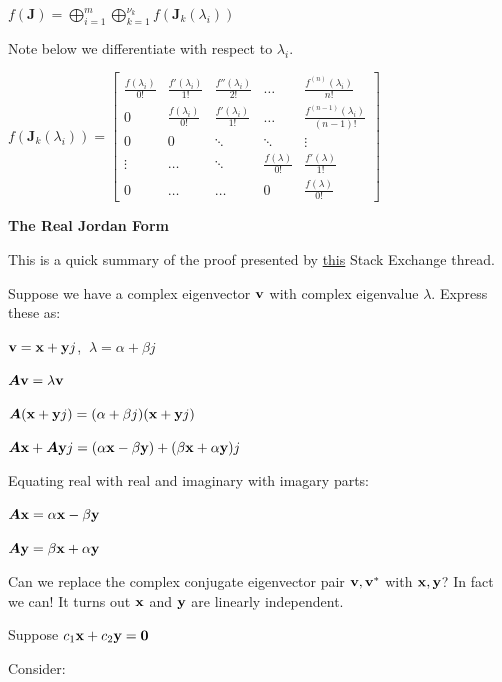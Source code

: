 \documentclass[11pt]{article}
\begin{document}
  \(f(\bm{J}) = \displaystyle \bigoplus_{i = 1}^{m} \bigoplus_{k = 1}^{\nu_k}f(\bm{J}_k(\lambda_i))\)

  Note below we differentiate with respect to \(\lambda_i\).

  \(f(\bm{J}_k(\lambda_i)) =
  \begin{bmatrix}
    \frac{f(\lambda_i)}{0!} & \frac{f'(\lambda_i)}{1!} & \frac{f''(\lambda_i)}{2!} & \dots & \frac{f^{(n)}(\lambda_i)}{n!} \\
    0 & \frac{f(\lambda_i)}{0!} & \frac{f'(\lambda_i)}{1!} & \dots & \frac{f^{(n - 1)}(\lambda_i)}{(n - 1)!} \\
    0 & 0 & \ddots & \ddots & \vdots \\
    \vdots & \dots & \ddots & \frac{f(\lambda)}{0!} & \frac{f'(\lambda)}{1!} \\
    0 & \dots & \dots & 0 & \frac{f(\lambda)}{0!}
  \end{bmatrix}\)

  \textbf{The Real Jordan Form}

  This is a quick summary of the proof presented by
  \href{https://math.stackexchange.com/questions/769312/proof-for-real-jordan-canonical-form}{this} Stack Exchange thread.

  Suppose we have a complex eigenvector \(\mathbf{v}\) with complex eigenvalue \(\lambda\). Express these as:

  \(\mathbf{v} = \mathbf{x} + \mathbf{y}j\),
  \(\ \lambda = \alpha + \beta j\)

  \(\bm{A}\mathbf{v} = \lambda\mathbf{v}\)

  \(\bm{A}{\left( \mathbf{x} + \mathbf{y}j \right)} = (\alpha + \beta j){\left( \mathbf{x} + \mathbf{y}j \right)}\)

  \(\bm{A}\mathbf{x} + \bm{A}\mathbf{y}j = (\alpha\mathbf{x} - \beta\mathbf{y}) + (\beta\mathbf{x} + \alpha\mathbf{y})j\)

  Equating real with real and imaginary with imagary parts:

  \(\bm{A}\mathbf{x} = \alpha\mathbf{x} - \beta\mathbf{y}\)

  \(\bm{A}\mathbf{y} = \beta\mathbf{x} + \alpha\mathbf{y}\)

  Can we replace the complex conjugate eigenvector pair \(\mathbf{v}, \mathbf{v}^*\) with \(\mathbf{x}, \mathbf{y}\)?
  In fact we can! It turns out \(\mathbf{x}\) and \(\mathbf{y}\) are linearly independent.

  \pagebreak

  Suppose \(c_1\mathbf{x} + c_2\mathbf{y} = \mathbf{0}\)

  Consider:
\end{document}
